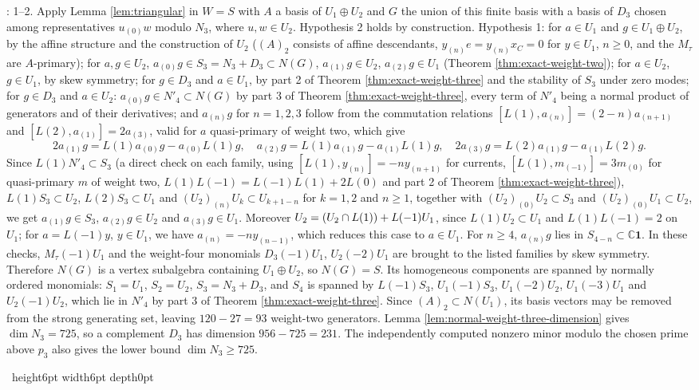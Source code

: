\documentclass[leqno]{article}
\newcommand{\Cbb}{\ensuremath{\mathbb{C}}}
\renewcommand{\geq}{\ensuremath{\geqslant}}
\newcommand{\qed}{\hfill \vrule height6pt  width6pt depth0pt}
\let\ker\relax
\DeclareMathOperator{\ker}{Ker}
\newenvironment{proof}[1][]{\noindent {\it Proof #1} : }{\hbox{~}\qed
\smallskip
}
\numberwithin{equation}{section}
\begin{document}
\begin{proof}
1--2. Apply Lemma \ref{lem:triangular} in $W = S$ with $A$ a basis of $U_1 \oplus U_2$ and $G$ the union of this finite basis with a basis of $D_3$ chosen among representatives $u_{(0)}w$ modulo $N_3$, where $u,w \in U_2$. Hypothesis 2 holds by construction. Hypothesis 1: for $a \in U_1$ and $g \in U_1 \oplus U_2$, by the affine structure and the construction of $U_2$ ($(A)_2$ consists of affine descendants, $y_{(n)}e = y_{(n)}x_C = 0$ for $y \in U_1$, $n \geq 0$, and the $M_\tau$ are $A$-primary); for $a, g \in U_2$, $a_{(0)}g \in S_3 = N_3 + D_3 \subset N(G)$, $a_{(1)}g \in U_2$, $a_{(2)}g \in U_1$ (Theorem \ref{thm:exact-weight-two}); for $a \in U_2$, $g \in U_1$, by skew symmetry; for $g \in D_3$ and $a \in U_1$, by part 2 of Theorem \ref{thm:exact-weight-three} and the stability of $S_3$ under zero modes; for $g \in D_3$ and $a \in U_2$: $a_{(0)}g \in N'_4 \subset N(G)$ by part 3 of Theorem \ref{thm:exact-weight-three}, every term of $N'_4$ being a normal product of generators and of their derivatives; and $a_{(n)}g$ for $n = 1, 2, 3$ follow from the commutation relations $[L(1), a_{(n)}] = (2-n)a_{(n+1)}$ and $[L(2), a_{(1)}] = 2a_{(3)}$, valid for $a$ quasi-primary of weight two, which give
\[
2a_{(1)}g = L(1)a_{(0)}g - a_{(0)}L(1)g, \quad a_{(2)}g = L(1)a_{(1)}g - a_{(1)}L(1)g, \quad 2a_{(3)}g = L(2)a_{(1)}g - a_{(1)}L(2)g.
\]
Since $L(1)N'_4 \subset S_3$ (a direct check on each family, using $[L(1), y_{(n)}] = -n y_{(n+1)}$ for currents, $[L(1), m_{(-1)}] = 3m_{(0)}$ for quasi-primary $m$ of weight two, $L(1)L(-1) = L(-1)L(1) + 2L(0)$ and part 2 of Theorem \ref{thm:exact-weight-three}), $L(1)S_3 \subset U_2$, $L(2)S_3 \subset U_1$ and $(U_2)_{(n)}U_k \subset U_{k+1-n}$ for $k = 1,2$ and $n \geq 1$, together with $(U_2)_{(0)}U_2 \subset S_3$ and $(U_2)_{(0)}U_1 \subset U_2$, we get $a_{(1)}g \in S_3$, $a_{(2)}g \in U_2$ and $a_{(3)}g \in U_1$. Moreover $U_2 = (U_2 \cap \ker L(1)) + L(-1)U_1$, since $L(1)U_2 \subset U_1$ and $L(1)L(-1) = 2$ on $U_1$; for $a = L(-1)y$, $y \in U_1$, we have $a_{(n)} = -n y_{(n-1)}$, which reduces this case to $a \in U_1$. For $n \geq 4$, $a_{(n)}g$ lies in $S_{4-n} \subset \Cbb\mathbf 1$. In these checks, $M_\tau(-1)U_1$ and the weight-four monomials $D_3(-1)U_1$, $U_2(-2)U_1$ are brought to the listed families by skew symmetry. Therefore $N(G)$ is a vertex subalgebra containing $U_1 \oplus U_2$, so $N(G) = S$. Its homogeneous components are spanned by normally ordered monomials: $S_1 = U_1$, $S_2 = U_2$, $S_3 = N_3 + D_3$, and $S_4$ is spanned by $L(-1)S_3$, $U_1(-1)S_3$, $U_1(-2)U_2$, $U_1(-3)U_1$ and $U_2(-1)U_2$, which lie in $N'_4$ by part 3 of Theorem \ref{thm:exact-weight-three}. Since $(A)_2 \subset N(U_1)$, its basis vectors may be removed from the strong generating set, leaving $120-27 = 93$ weight-two generators. Lemma \ref{lem:normal-weight-three-dimension} gives $\dim N_3 = 725$, so a complement $D_3$ has dimension $956-725 = 231$. The independently computed nonzero minor modulo the chosen prime above $p_3$ also gives the lower bound $\dim N_3 \geq 725$.


\end{proof}
\end{document}
